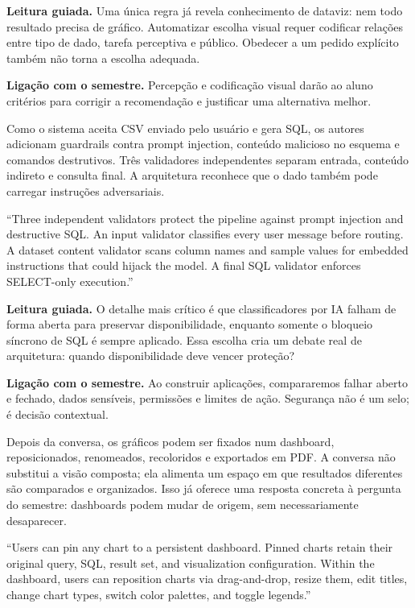 \noindent\textbf{Leitura guiada.} Uma única regra já revela conhecimento de dataviz: nem todo resultado precisa de gráfico. Automatizar escolha visual requer codificar relações entre tipo de dado, tarefa perceptiva e público. Obedecer a um pedido explícito também não torna a escolha adequada.

\noindent\textbf{Ligação com o semestre.} Percepção e codificação visual darão ao aluno critérios para corrigir a recomendação e justificar uma alternativa melhor.

Como o sistema aceita CSV enviado pelo usuário e gera SQL, os autores adicionam guardrails contra prompt injection, conteúdo malicioso no esquema e comandos destrutivos. Três validadores independentes separam entrada, conteúdo indireto e consulta final. A arquitetura reconhece que o dado também pode carregar instruções adversariais.

\begin{ArticleBox}
``Three independent validators protect the pipeline against prompt injection and destructive SQL. An input validator classifies every user message before routing. A dataset content validator scans column names and sample values for embedded instructions that could hijack the model. A final SQL validator enforces SELECT-only execution.''
\end{ArticleBox}

\noindent\textbf{Leitura guiada.} O detalhe mais crítico é que classificadores por IA falham de forma aberta para preservar disponibilidade, enquanto somente o bloqueio síncrono de SQL é sempre aplicado. Essa escolha cria um debate real de arquitetura: quando disponibilidade deve vencer proteção?

\noindent\textbf{Ligação com o semestre.} Ao construir aplicações, compararemos falhar aberto e fechado, dados sensíveis, permissões e limites de ação. Segurança não é um selo; é decisão contextual.

Depois da conversa, os gráficos podem ser fixados num dashboard, reposicionados, renomeados, recoloridos e exportados em PDF. A conversa não substitui a visão composta; ela alimenta um espaço em que resultados diferentes são comparados e organizados. Isso já oferece uma resposta concreta à pergunta do semestre: dashboards podem mudar de origem, sem necessariamente desaparecer.

\begin{ArticleBox}
``Users can pin any chart to a persistent dashboard. Pinned charts retain their original query, SQL, result set, and visualization configuration. Within the dashboard, users can reposition charts via drag-and-drop, resize them, edit titles, change chart types, switch color palettes, and toggle legends.''
\end{ArticleBox}

